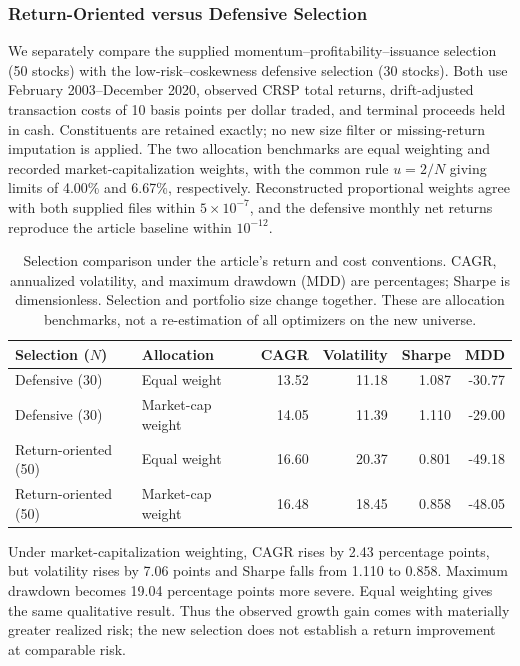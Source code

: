 \subsubsection{Return-Oriented versus Defensive Selection}\label{sec:selectionrisk}
We separately compare the supplied momentum--profitability--issuance selection (50 stocks) with the low-risk--coskewness defensive selection (30 stocks). Both use February 2003--December 2020, observed CRSP total returns, drift-adjusted transaction costs of 10 basis points per dollar traded, and terminal proceeds held in cash. Constituents are retained exactly; no new size filter or missing-return imputation is applied. The two allocation benchmarks are equal weighting and recorded market-capitalization weights, with the common rule $u=2/N$ giving limits of 4.00\% and 6.67\%, respectively. Reconstructed proportional weights agree with both supplied files within $5\times10^{-7}$, and the defensive monthly net returns reproduce the article baseline within $10^{-12}$.

\begin{table}[!htbp]\centering
\caption{Selection comparison under the article's return and cost conventions. CAGR, annualized volatility, and maximum drawdown (MDD) are percentages; Sharpe is dimensionless. Selection and portfolio size change together. These are allocation benchmarks, not a re-estimation of all optimizers on the new universe.}\label{tab:selectionrisk}
\small\begin{tabular}{llrrrr}\toprule
Selection ($N$) & Allocation & CAGR & Volatility & Sharpe & MDD\\\midrule
Defensive (30) & Equal weight & 13.52 & 11.18 & 1.087 & -30.77 \\
Defensive (30) & Market-cap weight & 14.05 & 11.39 & 1.110 & -29.00 \\
Return-oriented (50) & Equal weight & 16.60 & 20.37 & 0.801 & -49.18 \\
Return-oriented (50) & Market-cap weight & 16.48 & 18.45 & 0.858 & -48.05 \\
\bottomrule\end{tabular}\end{table}

Under market-capitalization weighting, CAGR rises by 2.43 percentage points, but volatility rises by 7.06 points and Sharpe falls from 1.110 to 0.858. Maximum drawdown becomes 19.04 percentage points more severe. Equal weighting gives the same qualitative result. Thus the observed growth gain comes with materially greater realized risk; the new selection does not establish a return improvement at comparable risk.

